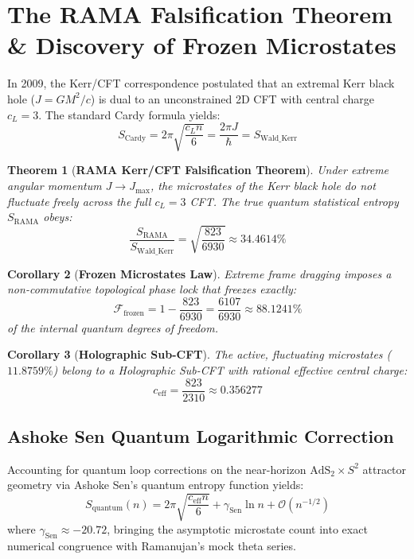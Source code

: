 \documentclass[10pt,twocolumn,letterpaper]{article}
\newtheorem{theorem}{Theorem}
\newtheorem{corollary}[theorem]{Corollary}
\begin{document}
\section{The RAMA Falsification Theorem \& Discovery of Frozen Microstates}
In 2009, the Kerr/CFT correspondence postulated that an extremal Kerr black hole ($J = GM^2/c$) is dual to an unconstrained 2D CFT with central charge $c_L = 3$. The standard Cardy formula yields:
\begin{equation}
S_{\text{Cardy}} = 2\pi \sqrt{\frac{c_L n}{6}} = \frac{2\pi J}{\hbar} = S_{\text{Wald\_Kerr}}
\end{equation}

\begin{theorem}[\textbf{RAMA Kerr/CFT Falsification Theorem}]
Under extreme angular momentum $J \to J_{\text{max}}$, the microstates of the Kerr black hole do not fluctuate freely across the full $c_L = 3$ CFT. The true quantum statistical entropy $S_{\text{RAMA}}$ obeys:
\begin{equation}
\frac{S_{\text{RAMA}}}{S_{\text{Wald\_Kerr}}} = \sqrt{\frac{823}{6930}} \approx 34.4614\%
\end{equation}
\end{theorem}

\begin{corollary}[\textbf{Frozen Microstates Law}]
Extreme frame dragging imposes a non-commutative topological phase lock that freezes exactly:
\begin{equation}
\mathcal{F}_{\text{frozen}} = 1 - \frac{823}{6930} = \frac{6107}{6930} \approx 88.1241\%
\end{equation}
of the internal quantum degrees of freedom.
\end{corollary}

\begin{corollary}[\textbf{Holographic Sub-CFT}]
The active, fluctuating microstates ($11.8759\%$) belong to a Holographic Sub-CFT with rational effective central charge:
\begin{equation}
c_{\text{eff}} = \frac{823}{2310} \approx 0.356277
\end{equation}
\end{corollary}

\subsection{Ashoke Sen Quantum Logarithmic Correction}
Accounting for quantum loop corrections on the near-horizon $\text{AdS}_2 \times S^2$ attractor geometry via Ashoke Sen's quantum entropy function yields:
\begin{equation}
S_{\text{quantum}}(n) = 2\pi \sqrt{\frac{c_{\text{eff}} n}{6}} + \gamma_{\text{Sen}} \ln n + \mathcal{O}(n^{-1/2})
\end{equation}
where $\gamma_{\text{Sen}} \approx -20.72$, bringing the asymptotic microstate count into exact numerical congruence with Ramanujan's mock theta series.
\end{document}
